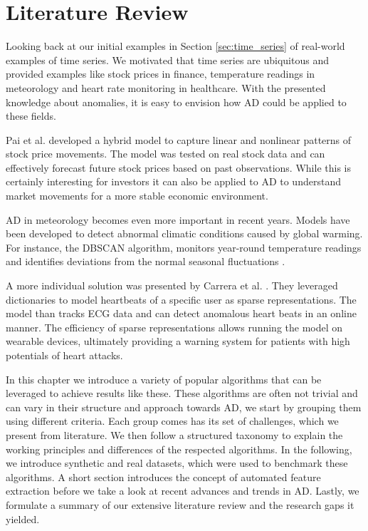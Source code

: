 \chapter{Literature Review}
\label{ch:literature_review}
Looking back at our initial examples in Section \ref{sec:time_series} of real-world examples of time series. We motivated that time series are ubiquitous and provided examples like stock prices in finance, temperature readings in meteorology and heart rate monitoring in healthcare. With the presented knowledge about anomalies, it is easy to envision how AD could be applied to these fields.

Pai et al. \cite{Pai2005} developed a hybrid model to capture linear and nonlinear patterns of stock price movements. The model was tested on real stock data and can effectively forecast future stock prices based on past observations. While this is certainly interesting for investors it can also be applied to AD to understand market movements for a more stable economic environment.

AD in meteorology becomes even more important in recent years. Models have been developed to detect abnormal climatic conditions caused by global warming. For instance, the DBSCAN algorithm, monitors year-round temperature readings and identifies deviations from the normal seasonal fluctuations \cite{Celik2011}.

A more individual solution was presented by Carrera et al. \cite{Carrera2019}. They leveraged dictionaries to model heartbeats of a specific user as sparse representations. The model than tracks ECG data and can detect anomalous heart beats in an online manner. The efficiency of sparse representations allows running the model on wearable devices, ultimately providing a warning system for patients with high potentials of heart attacks.

In this chapter we introduce a variety of popular algorithms that can be leveraged to achieve results like these. These algorithms are often not trivial and can vary in their structure and approach towards AD, we start by grouping them using different criteria. Each group comes has its set of challenges, which we present from literature. We then follow a structured taxonomy to explain the working principles and differences of the respected algorithms. In the following, we introduce synthetic and real datasets, which were used to benchmark these algorithms. A short section introduces the concept of automated feature extraction before we take a look at recent advances and trends in AD. Lastly, we formulate a summary of our extensive literature review and the research gaps it yielded.

